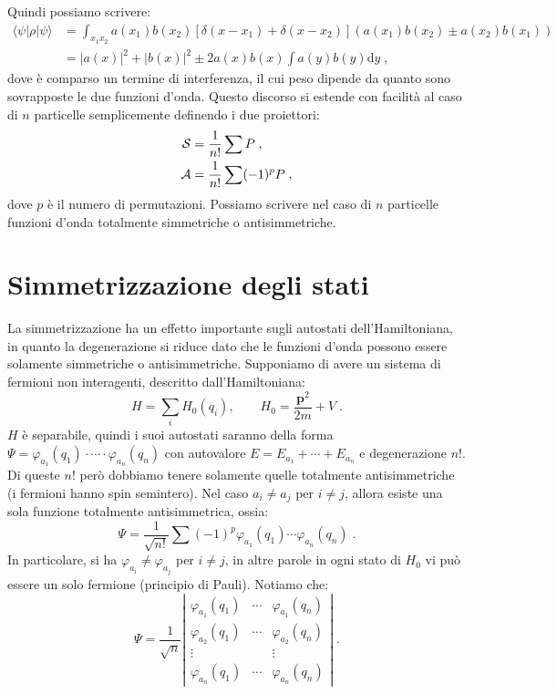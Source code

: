 \documentclass[10pt,a4paper]{report}
\theoremstyle{definition}
\numberwithin{equation}{section}
\newcommand{\diff}[1][]{\mathrm{d}#1}
\newcommand{\bra}{\langle}
\newcommand{\ket}{\rangle}
\begin{document}
Quindi possiamo scrivere:
\begin{align}
\bra \psi|\rho|\psi\ket &= \int_{x_1x_2}a(x_1)b(x_2)[\delta(x-x_1)+\delta(x-x_2)](a(x_1)b(x_2)\pm a(x_2)b(x_1)) \\
&= |a(x)|^2+|b(x)|^2\pm 2a(x)b(x)\int a(y)b(y)\diff{y}\;,
\end{align}
dove è comparso un termine di interferenza, il cui peso dipende da quanto sono sovrapposte le due funzioni d'onda. Questo discorso si estende con facilità al caso di $n$ particelle semplicemente definendo i due proiettori:
\begin{align}
\mathcal{S} &= \frac{1}{n!}\sum P\;, \\ \notag 
\mathcal{A} &= \frac{1}{n!}\sum (-1)^pP\;,
\end{align}
dove $p$ è il numero di permutazioni. Possiamo scrivere nel caso di $n$ particelle funzioni d'onda totalmente simmetriche o antisimmetriche.
\section{Simmetrizzazione degli stati}
La simmetrizzazione ha un effetto importante sugli autostati dell'Hamiltoniana, in quanto la degenerazione si riduce dato che le funzioni d'onda possono essere solamente simmetriche o antisimmetriche. Supponiamo di avere un sistema di fermioni non interagenti, descritto dall'Hamiltoniana:
\begin{equation}
H=\sum_i H_0(q_i),\qquad H_0=\frac{\mathbf{p}^2}{2m}+V\;.
\end{equation}
$H$ è separabile, quindi i suoi autostati saranno della forma $\Psi=\varphi_{a_1}(q_1)\cdot\cdots\cdot\varphi_{a_n}(q_n)$ con autovalore $E=E_{a_1}+\cdots+E_{a_n}$ e degenerazione $n!$. Di queste $n!$ però dobbiamo tenere solamente quelle totalmente antisimmetriche (i fermioni hanno spin semintero). Nel caso $a_i\ne a_j$ per $i\ne j$, allora esiste una sola funzione totalmente antisimmetrica, ossia:
\begin{equation}
\Psi=\frac{1}{\sqrt{n!}}\sum (-1)^p\varphi_{a_1}(q_1)\cdots\varphi_{a_n}(q_n)\;.
\end{equation}
In particolare, si ha $\varphi_{a_i}\ne\varphi_{a_j}$ per $i\ne j$, in altre parole in ogni stato di $H_0$ vi può essere un solo fermione (principio di Pauli). Notiamo che:
\begin{equation}
\Psi=\frac{1}{\sqrt{n}}\left|\begin{matrix}
\varphi_{a_1}(q_1) & \cdots & \varphi_{a_1}(q_n) \\
\varphi_{a_2}(q_1) & \cdots & \varphi_{a_2}(q_n) \\
\vdots & {} & \vdots \\
\varphi_{a_n}(q_1) & \cdots & \varphi_{a_n}(q_n)
\end{matrix}\right|\;.
\end{equation}
\end{document}
